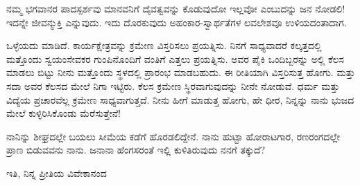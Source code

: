 ನಮ್ಮ ಭಗವಾನರ ಪಾದಸ್ಪರ್ಶವು ಮಾನವನಿಗೆ ದೈವತ್ವವನ್ನು ಕೊಡುವುದೋ ಇಲ್ಲವೋ ಎಂಬುದನ್ನು ಜನ ನೋಡಲಿ! ಇದನ್ನೇ ಜೀವನ್ಮುಕ್ತಿ ಎನ್ನುವುದು. ಇದು ದೊರಕುವುದು ಅಹಂಕಾರ-ಸ್ವಾರ್ಥತೆಗಳ ಲವಲೇಶವೂ ಉಳಿಯದಂತಾದಾಗ.

ಒಳ್ಳೆಯದು ಮಾಡಿದೆ. ಕಾರ್ಯಕ್ಷೇತ್ರವನ್ನು ಕ್ರಮೇಣ ವಿಸ್ತರಿಸಲು ಪ್ರಯತ್ನಿಸು. ನಿನಗೆ ಸಾಧ್ಯವಾದರೆ ಕಲ್ಕತ್ತದಲ್ಲಿ ಮತ್ತೊಂದು ಸ್ವಯಂಸೇವಕರ ಗುಂಪಿನೊಂದಿಗೆ ವಂತಿಗೆ ಎತ್ತಲು ಪ್ರಯತ್ನಿಸು. ಅವರ ಪೈಕಿ ಒಂದಿಬ್ಬರನ್ನು ಅಲ್ಲಿ ಕೆಲಸ ಮಾಡಲು ಬಿಟ್ಟು ನೀನು ಮತ್ತೊಂದು ಸ್ಥಳದಲ್ಲಿ ಪ್ರಾರಂಭ ಮಾಡಬಹುದು. ಈ ರೀತಿಯಾಗಿ ವಿಸ್ತರಿಸುತ್ತ ಹೋಗು. ಮತ್ತು ಸದಾ ಅವರ ಕೆಲಸದ ಮೇಲೆ ನಿಗಾ ಇಟ್ಟಿರು. ಕೆಲಸ ಕ್ರಮೇಣ ಸ್ಥಿರವಾಗುವುದನ್ನು ನೀನೇ ನೋಡುವೆ. ಧರ್ಮ ಮತ್ತು ವಿದ್ಯೆಯ ಪ್ರಚಾರವೆಲ್ಲ ಕ್ರಮೇಣ ಸಾಧ್ಯವಾಗುತ್ತದೆ. ನೀನು ಹೀಗೆ ಮಾಡುತ್ತ ಹೋಗು, ಹೇ ಧೀರ, ನಿನ್ನನ್ನು ನಾನು ಭುಜದ ಮೇಲೆ ಕುಳ್ಳಿರಿಸಿಕೊಂಡು ಮೆರೆಸುತ್ತೇನೆ!

ನಾನಿನ್ನು ಶೀಘ್ರದಲ್ಲೇ ಬಯಲು ಸೀಮೆಯ ಕಡೆಗೆ ಹೊರಡಲಿದ್ದೇನೆ. ನಾನು ಹುಟ್ಟಾ ಹೋರಾಟಗಾರ, ರಣರಂಗದಲ್ಲೇ ಪ್ರಾಣ ಬಿಡುವವನು ನಾನು. ಜನಾನಾ ಹೆಂಗಸರಂತೆ ಇಲ್ಲಿ ಕುಳಿತಿರುವುದು ನನಗೆ ತಕ್ಕುದೆ?

\begin{flushright}
ಇತಿ, ನಿನ್ನ ಪ್ರೀತಿಯ ವಿವೇಕಾನಂದ
\end{flushright}


